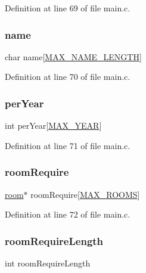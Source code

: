 Definition at line 69 of file main.\+c.

\hypertarget{structsubject_ad50982abf9e9bbbc784f8f17fa25b1b2}{}\label{structsubject_ad50982abf9e9bbbc784f8f17fa25b1b2} 
\subsubsection{\texorpdfstring{name}{name}}
{\footnotesize\ttfamily char name\mbox{[}\hyperlink{main_8c_a0c397a708cec89c74029582574516b30}{M\+A\+X\+\_\+\+N\+A\+M\+E\+\_\+\+L\+E\+N\+G\+TH}\mbox{]}}



Definition at line 70 of file main.\+c.

\hypertarget{structsubject_a9f7950b8cf851cd516b4139193f73d43}{}\label{structsubject_a9f7950b8cf851cd516b4139193f73d43} 
\subsubsection{\texorpdfstring{per\+Year}{perYear}}
{\footnotesize\ttfamily int per\+Year\mbox{[}\hyperlink{main_8c_a59bcbb5f6896e44dfd79fa63508cfec3}{M\+A\+X\+\_\+\+Y\+E\+AR}\mbox{]}}



Definition at line 71 of file main.\+c.

\hypertarget{structsubject_a5ae5b3c6b809ca65585611691557c8e5}{}\label{structsubject_a5ae5b3c6b809ca65585611691557c8e5} 
\subsubsection{\texorpdfstring{room\+Require}{roomRequire}}
{\footnotesize\ttfamily \hyperlink{structroom}{room}$\ast$ room\+Require\mbox{[}\hyperlink{main_8c_a251d94cd24a2ca3369fc3f8eca8c19ae}{M\+A\+X\+\_\+\+R\+O\+O\+MS}\mbox{]}}



Definition at line 72 of file main.\+c.

\hypertarget{structsubject_afb17ea87eab6c072f053b2e6c390d873}{}\label{structsubject_afb17ea87eab6c072f053b2e6c390d873} 
\subsubsection{\texorpdfstring{room\+Require\+Length}{roomRequireLength}}
{\footnotesize\ttfamily int room\+Require\+Length}



